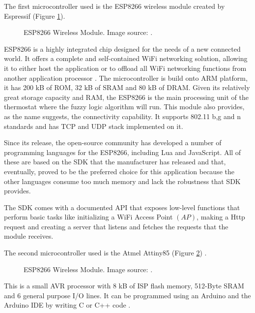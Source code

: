 \documentclass[conference]{IEEEtran}
\begin{document}
The first microcontroller used is the ESP8266 wireless module created by Espressif (Figure \ref{fig:esp8266}).

\begin{figure}[h!]
\label{fig:esp8266}
\centerline{}
      \caption[ESP8266]{ESP8266 Wireless Module. Image source: \cite{website:esppicture}.}
\label{fig:esp8266}
\end{figure}

ESP8266 is a highly integrated chip designed for the needs of a new connected world. It offers a complete and
self-contained WiFi networking solution, allowing it to either host the application or to offload all WiFi
networking functions from another application processor \cite{website:espressifdesc}.
The microcontroller is build onto ARM platform, it has 200 kB of ROM, 32 kB of SRAM and 80 kB of DRAM.
Given its relatively great storage capacity and RAM, the ESP8266 is the main processing unit of the thermostat
where the fuzzy logic algorithm will run.
This module also provides, as the name suggests, the connectivity capability. It supports 802.11 b,g and n
standards and has TCP and UDP stack implemented on it.

Since its release, the open-source community has developed a number of programming languages for the ESP8266,
including Lua\cite{website:nodemcu} and JavaScript\cite{website:espruino}. All of these are based on the SDK
that the manufacturer has released and that, eventually, proved to be the preferred choice for this
application because the other languages consume too much memory and lack the robustness that SDK provides.

The SDK comes with a documented API that exposes low-level functions that perform basic tasks like initializing
a WiFi Access Point $(AP)$, making a Http request and creating a server that listens and fetches the requests
that the module receives.

The second microcontroller used is the Atmel Attiny85 (Figure \ref{fig:attiny85}) \cite{website:attiny85}.

\begin{figure}[h!]
\label{fig:attiny85}
\centerline{}
      \caption[attiny85]{ESP8266 Wireless Module. Image source: \cite{website:esppicture}.}
\label{fig:attiny85}
\end{figure}

This is a small AVR processor with 8 kB of ISP flash memory, 512-Byte SRAM and 6 general purpose I/O lines.
It can be programmed using an Arduino and the Arduino IDE by writing C or C++ code \cite{website:attiny85program}.
\end{document}
